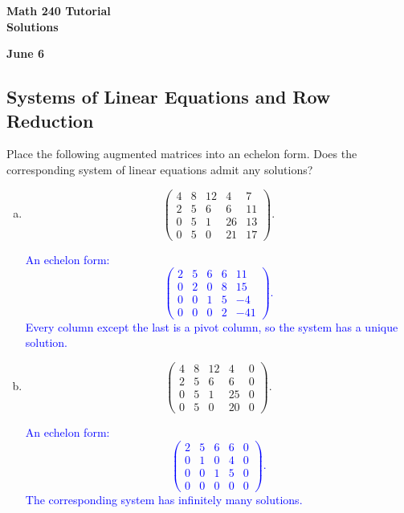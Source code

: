 \documentclass[a4paper,11pt]{article}
\newcommand{\BB}[1]{\textcolor{blue}{#1}}
\begin{document}
\begin{center}
  {\Large\bfseries Math 240 Tutorial \\ Solutions}
\end{center}
\begin{center}
  {\bfseries June 6}
\end{center}

\subsection*{Systems of Linear Equations and Row Reduction}

 Place the following augmented matrices into
an echelon form. Does the corresponding system of linear equations admit any
solutions?
\begin{enumerate}[(a)]
\item
  \[
    \left(
      \begin{array}{cccc|c}
        4 & 8 & 12 & 4 & 7 \\
        2 & 5 & 6 & 6 & 11 \\
        0 & 5 & 1 & 26 & 13 \\
        0 & 5 & 0 & 21 & 17
      \end{array}
    \right).
  \]

  \BB{
    An echelon form:
    \[
      \left(
        \begin{array}{cccc|c}
          2 & 5 & 6 & 6 & 11 \\
          0 & 2 & 0 & 8 & 15 \\
          0 & 0 & 1 & 5 & -4 \\
          0 & 0 & 0 & 2 & -41
        \end{array}
      \right).
    \]
    Every column except the last is a pivot column, so the system has a unique
    solution.  \\
  }
  
\item
  \[
    \left(
      \begin{array}{cccc|c}
        4 & 8 & 12 & 4 & 0 \\
        2 & 5 & 6 & 6 & 0 \\
        0 & 5 & 1 & 25 & 0 \\
        0 & 5 & 0 & 20 & 0       
      \end{array}
    \right).
  \]

  \BB{
    An echelon form:
    \[
      \left(
        \begin{array}{cccc|c}
          2 & 5 & 6 & 6 & 0 \\
          0 & 1 & 0 & 4 & 0 \\
          0 & 0 & 1 & 5 & 0 \\
          0 & 0 & 0 & 0 & 0
        \end{array}
      \right).
    \]
    The corresponding system has infinitely many solutions. \\
  }


\end{enumerate}
\end{document}
